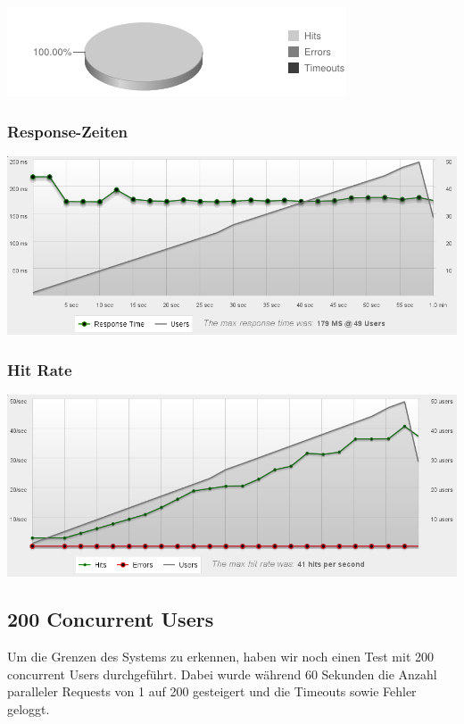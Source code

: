 \documentclass[10pt,a4paper]{scrartcl}
\begin{document}
\includegraphics[scale=1]{loadtests/chart-50.png}

\subsubsection*{Response-Zeiten}

\includegraphics[width=\textwidth]{loadtests/responsetimes-50.png}

\subsubsection*{Hit Rate}

\includegraphics[width=\textwidth]{loadtests/hitrate-50.png}


\subsection{200 Concurrent Users}

Um die Grenzen des Systems zu erkennen, haben wir noch einen Test mit 200 concurrent Users
durchgeführt. Dabei wurde während 60 Sekunden die Anzahl paralleler Requests von 1 auf 200
gesteigert und die Timeouts sowie Fehler geloggt.
\end{document}
